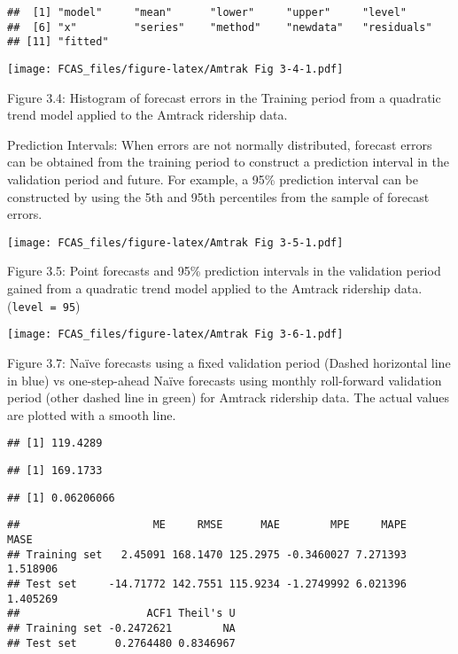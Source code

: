 \documentclass[]{article}
\begin{document}
\begin{verbatim}
##  [1] "model"     "mean"      "lower"     "upper"     "level"    
##  [6] "x"         "series"    "method"    "newdata"   "residuals"
## [11] "fitted"
\end{verbatim}

\texttt{[image: FCAS\_files/figure-latex/Amtrak Fig 3-4-1.pdf]}

Figure 3.4: Histogram of forecast errors in the Training period from a
quadratic trend model applied to the Amtrack ridership data.

Prediction Intervals: When errors are not normally distributed, forecast
errors can be obtained from the training period to construct a
prediction interval in the validation period and future. For example, a
95\% prediction interval can be constructed by using the 5th and 95th
percentiles from the sample of forecast errors.

\texttt{[image: FCAS\_files/figure-latex/Amtrak Fig 3-5-1.pdf]}

Figure 3.5: Point forecasts and 95\% prediction intervals in the
validation period gained from a quadratic trend model applied to the
Amtrack ridership data. (\texttt{level\ =\ 95})

\texttt{[image: FCAS\_files/figure-latex/Amtrak Fig 3-6-1.pdf]}

Figure 3.7: Naïve forecasts using a fixed validation period (Dashed
horizontal line in blue) vs one-step-ahead Naïve forecasts using monthly
roll-forward validation period (other dashed line in green) for Amtrack
ridership data. The actual values are plotted with a smooth line.

\begin{verbatim}
## [1] 119.4289
\end{verbatim}

\begin{verbatim}
## [1] 169.1733
\end{verbatim}

\begin{verbatim}
## [1] 0.06206066
\end{verbatim}

\begin{verbatim}
##                     ME     RMSE      MAE        MPE     MAPE     MASE
## Training set   2.45091 168.1470 125.2975 -0.3460027 7.271393 1.518906
## Test set     -14.71772 142.7551 115.9234 -1.2749992 6.021396 1.405269
##                    ACF1 Theil's U
## Training set -0.2472621        NA
## Test set      0.2764480 0.8346967
\end{verbatim}
\end{document}
